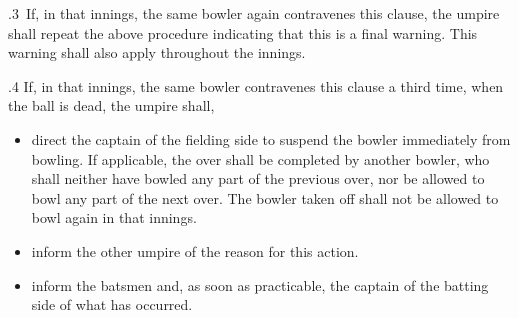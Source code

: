 \documentclass[12pt]{article}
\begin{document}
\vspace{\baselineskip}
\begin{adjustwidth}{0.0in}{0.46in}
\begin{FlushRight}
{\fontsize{9pt}{10.8pt}.3\  If, in that innings, the same bowler again contravenes this clause, the umpire shall repeat the above procedure indicating that this is a final warning. This warning shall also apply throughout the innings.\par}
\end{FlushRight}\par

\end{adjustwidth}


\vspace{\baselineskip}
\begin{adjustwidth}{0.5in}{0.21in}
{\fontsize{9pt}{10.8pt}.4 If, in that innings, the same bowler contravenes this clause a third time, when the ball is dead, the umpire shall,\par}\par

\end{adjustwidth}


\vspace{\baselineskip}
\begin{itemize}
	\item {\fontsize{9pt}{10.8pt}\selectfont direct the captain of the fielding side to suspend the bowler immediately from bowling. If applicable, the over shall be completed by another bowler, who shall neither have bowled any part of the previous over, nor be allowed to bowl any part of the next over. The bowler taken off shall not be allowed to bowl again in that innings.\par}\par


\vspace{\baselineskip}
	\item {\fontsize{9pt}{10.8pt}\selectfont inform the other umpire of the reason for this action.\par}\par


\vspace{\baselineskip}
	\item {\fontsize{9pt}{10.8pt}\selectfont inform the batsmen and, as soon as practicable, the captain of the batting side of what has occurred.\par}
\end{itemize}\par
\end{document}
